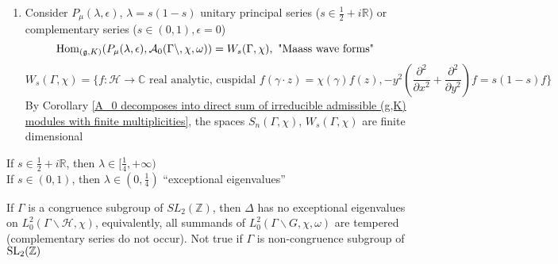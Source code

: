 \documentclass[main]{subfiles}
\begin{document}
\begin{enumerate}[leftmargin=*]
\begin{center}
\begin{tikzcd}
\end{tikzcd}
\end{center}
\item Consider $P_\mu(\lambda,\epsilon)$, $\lambda=s(1-s)$ unitary principal series ($s\in\frac{1}{2}+i\mathbb R$) or complementary series ($s\in(0,1),\epsilon=0$)
\[\Hom_{(\mathfrak g,K)}(P_\mu(\lambda,\epsilon),\mathcal A_0(\Gamma\backslash,\chi,\omega))=W_s(\Gamma,\chi),\text{ "Maass wave forms"}\]
\[W_s(\Gamma,\chi)=\{f:\mathcal H\to\mathbb C\text{ real analytic, cuspidal }f(\gamma\cdot z)=\chi(\gamma)f(z),-y^2(\frac{\partial^2}{\partial x^2}+\frac{\partial^2}{\partial y^2})f=s(1-s)f\}\]
By Corollary \ref{A_0 decomposes into direct sum of irreducible admissible (g,K) modules with finite multiplicities}, the spaces $S_n(\Gamma,\chi)$, $W_s(\Gamma,\chi)$ are finite dimensional
\end{enumerate}

\begin{note}
If $s\in \frac{1}{2}+i\mathbb R$, then $\lambda\in[\frac{1}{4},+\infty)$ \\
If $s\in(0,1)$, then $\lambda\in(0,\frac{1}{4})$ ``exceptional eigenvalues''
\end{note}

\begin{conjecture}[Selberg]
If $\Gamma$ is a congruence subgroup of $SL_2(\mathbb Z)$, then $\Delta$ has no exceptional eigenvalues on $L_0^2(\Gamma\backslash \mathcal H,\chi)$, equivalently, all summands of $L_0^2(\Gamma\backslash G,\chi,\omega)$ are tempered (complementary series do not occur). Not true if $\Gamma$ is non-congruence subgroup of $\SL_2(\mathbb Z)$
\end{conjecture}
\end{document}
